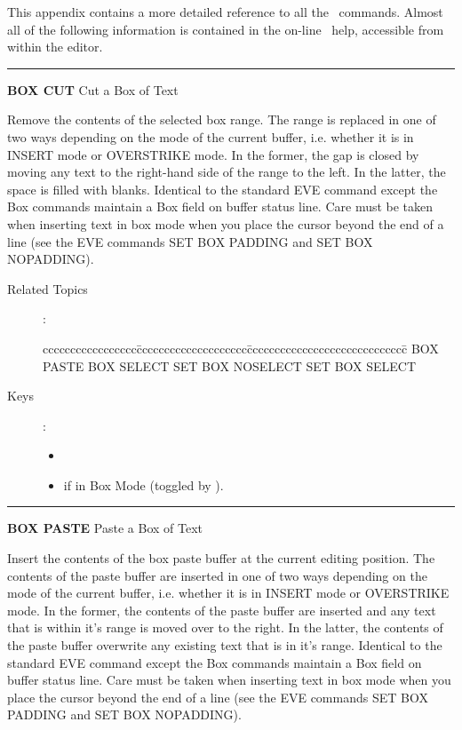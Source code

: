 This appendix contains a more detailed reference to all the \STEve\ commands. 
Almost all of the following information is contained in the on-line \STEve\
help, accessible from within the editor.

\bigskip

\rule{\textwidth}{0.3mm}

{\Large {\bf BOX CUT} \hfill Cut a Box of Text}

\medskip
Remove the contents of the selected box range. The range is replaced in one of
two ways depending on the mode of the current buffer, i.e. whether it is in
INSERT mode or OVERSTRIKE mode. In the former, the gap is closed by moving any
text to the right-hand side of the range to the left. In the latter, the space
is filled with blanks. Identical to the standard EVE command except the Box
commands maintain a Box field on buffer status line. Care must be taken when
inserting text in box mode when you place the cursor beyond the end of a line
(see the EVE commands SET BOX PADDING and SET BOX NOPADDING).

\begin{description}
\item[Related Topics]:
\begin{tabbing}
ccccccccccccccccc\=cccccccccccccccccccc\=ccccccccccccccccccccccccccccc\=\kill
BOX PASTE      \> BOX SELECT   \> SET BOX NOSELECT  \>   SET BOX SELECT \\
\end{tabbing}
\item[Keys]:
           \begin{itemize}
           \item \gold\ 
           \item \keyname{Remove} if in Box Mode (toggled by  ).
           \end{itemize}

\end{description}

\goodbreak

\rule{\textwidth}{0.3mm}

{\Large {\bf BOX PASTE} \hfill Paste a Box of Text}

\medskip
Insert the contents of the box paste buffer at the current editing position.
The contents of the paste buffer are inserted in one of two ways depending on
the mode of the current buffer, i.e. whether it is in INSERT mode or OVERSTRIKE
mode. In the former, the contents of the paste buffer are inserted and any text
that is within it's range is moved over to the right. In the latter, the
contents of the paste buffer overwrite any existing text that is in it's range.
Identical to the standard EVE command except the Box commands maintain a Box
field on buffer status line. Care must be taken when inserting text in box mode
when you place the cursor beyond the end of a line (see the EVE commands SET
BOX PADDING and SET BOX NOPADDING).

